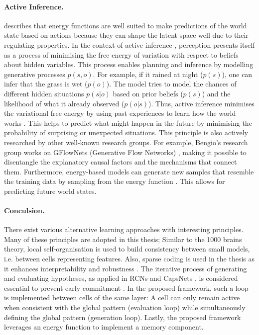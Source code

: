 \paragraph{Active Inference.}  describes that energy functions are well suited to make predictions of the world state based on actions because they can shape the latent space well due to their regulating properties.
In the context of active inference , perception presents itself as a process of minimising the free energy  of variation with respect to beliefs about hidden variables. This process enables planning and inference by modelling generative processes $p(s,o)$. For example, if it rained at night ($p(s)$), one can infer that the grass is wet ($p(o)$). The model tries to model the chances of different hidden situations $p(s|o)$ based on prior beliefs ($p(s)$) and the likelihood of what it already observed ($p(o|s)$). 
Thus, active inference minimises the variational free energy by using past experiences to learn how the world works \cite{friston_active_2016}. This helps to predict what might happen in the future by minimising the probability of surprising or unexpected situations.
This principle is also actively researched by other well-known research groups. For example, Bengio's research group works on GFlowNets (Generative Flow Networks) , making it possible to disentangle the explanatory causal factors and the mechanisms that connect them.
Furthermore, energy-based models can generate new samples that resemble the training data by sampling from the energy function . This allows for predicting future world states.

\paragraph{Conculsion.} There exist various alternative learning approaches with interesting principles. Many of these principles are adopted in this thesis; Similar to the 1000 brains theory, local self-organisation is used to build consistency between small models, i.e. between cells representing features.
Also, sparse coding is used in the thesis as it enhances interpretability and robustness . The iterative process of generating and evaluating hypotheses, as applied in RCNs  and CapsNets \cite{sabour_dynamic_2017}, is considered essential to prevent early commitment \cite{marr_vision_2010}. In the proposed framework, such a loop is implemented between cells of the same layer: A cell can only remain active when consistent with the global pattern (evaluation loop) while simultaneously defining the global pattern (generation loop). Lastly, the proposed framework leverages an energy function to implement a memory component. 

